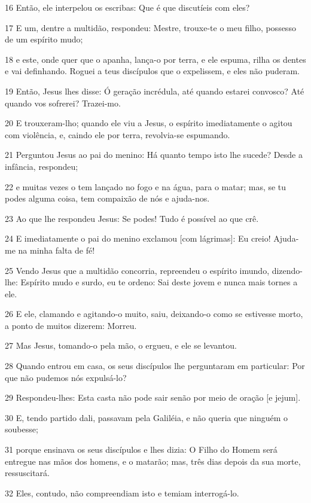 \par 16 Então, ele interpelou os escribas: Que é que discutíeis com eles?
\par 17 E um, dentre a multidão, respondeu: Mestre, trouxe-te o meu filho, possesso de um espírito mudo;
\par 18 e este, onde quer que o apanha, lança-o por terra, e ele espuma, rilha os dentes e vai definhando. Roguei a teus discípulos que o expelissem, e eles não puderam.
\par 19 Então, Jesus lhes disse: Ó geração incrédula, até quando estarei convosco? Até quando vos sofrerei? Trazei-mo.
\par 20 E trouxeram-lho; quando ele viu a Jesus, o espírito imediatamente o agitou com violência, e, caindo ele por terra, revolvia-se espumando.
\par 21 Perguntou Jesus ao pai do menino: Há quanto tempo isto lhe sucede? Desde a infância, respondeu;
\par 22 e muitas vezes o tem lançado no fogo e na água, para o matar; mas, se tu podes alguma coisa, tem compaixão de nós e ajuda-nos.
\par 23 Ao que lhe respondeu Jesus: Se podes! Tudo é possível ao que crê.
\par 24 E imediatamente o pai do menino exclamou [com lágrimas]: Eu creio! Ajuda-me na minha falta de fé!
\par 25 Vendo Jesus que a multidão concorria, repreendeu o espírito imundo, dizendo-lhe: Espírito mudo e surdo, eu te ordeno: Sai deste jovem e nunca mais tornes a ele.
\par 26 E ele, clamando e agitando-o muito, saiu, deixando-o como se estivesse morto, a ponto de muitos dizerem: Morreu.
\par 27 Mas Jesus, tomando-o pela mão, o ergueu, e ele se levantou.
\par 28 Quando entrou em casa, os seus discípulos lhe perguntaram em particular: Por que não pudemos nós expulsá-lo?
\par 29 Respondeu-lhes: Esta casta não pode sair senão por meio de oração [e jejum].
\par 30 E, tendo partido dali, passavam pela Galiléia, e não queria que ninguém o soubesse;
\par 31 porque ensinava os seus discípulos e lhes dizia: O Filho do Homem será entregue nas mãos dos homens, e o matarão; mas, três dias depois da sua morte, ressuscitará.
\par 32 Eles, contudo, não compreendiam isto e temiam interrogá-lo.
